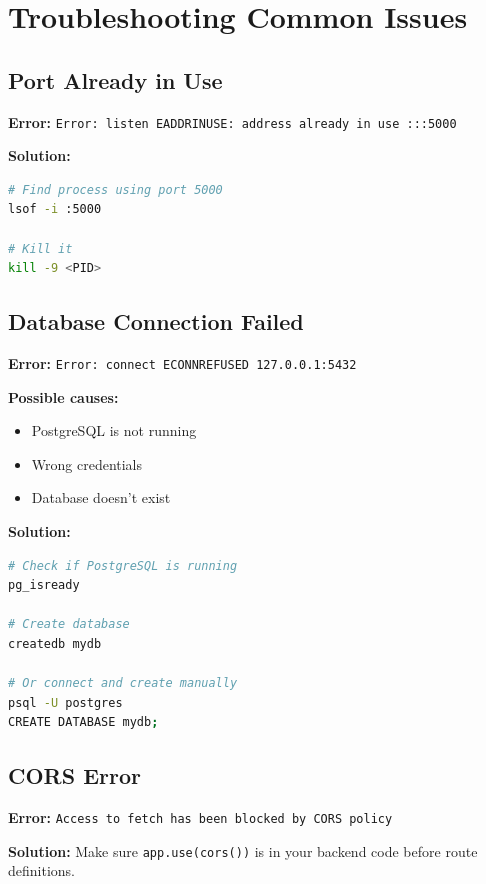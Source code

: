 \documentclass[12pt,a4paper]{article}
\begin{document}
\section{Troubleshooting Common Issues}

\subsection{Port Already in Use}

\textbf{Error:} \texttt{Error: listen EADDRINUSE: address already in use :::5000}

\textbf{Solution:}
\begin{lstlisting}[language=bash]
# Find process using port 5000
lsof -i :5000

# Kill it
kill -9 <PID>
\end{lstlisting}

\subsection{Database Connection Failed}

\textbf{Error:} \texttt{Error: connect ECONNREFUSED 127.0.0.1:5432}

\textbf{Possible causes:}
\begin{itemize}
    \item PostgreSQL is not running
    \item Wrong credentials
    \item Database doesn't exist
\end{itemize}

\textbf{Solution:}
\begin{lstlisting}[language=bash]
# Check if PostgreSQL is running
pg_isready

# Create database
createdb mydb

# Or connect and create manually
psql -U postgres
CREATE DATABASE mydb;
\end{lstlisting}

\subsection{CORS Error}

\textbf{Error:} \texttt{Access to fetch has been blocked by CORS policy}

\textbf{Solution:} Make sure \texttt{app.use(cors())} is in your backend code before route definitions.
\end{document}
